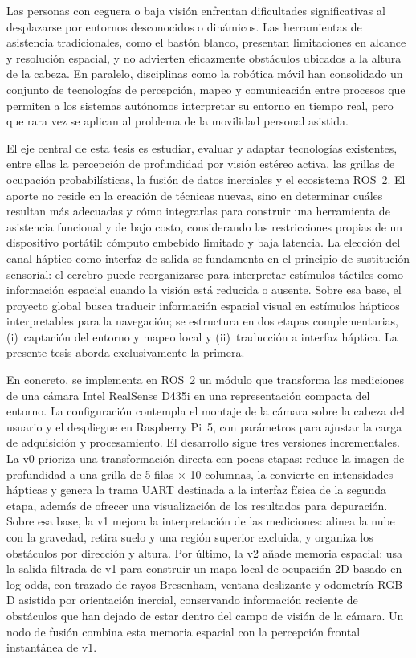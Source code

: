 Las personas con ceguera o baja visión enfrentan dificultades significativas al desplazarse por
entornos desconocidos o dinámicos. Las herramientas de asistencia tradicionales, como el bastón
blanco, presentan limitaciones en alcance y resolución espacial, y no advierten eficazmente
obstáculos ubicados a la altura de la cabeza. En paralelo, disciplinas como la robótica móvil han
consolidado un conjunto de tecnologías de percepción, mapeo y comunicación entre procesos que
permiten a los sistemas autónomos interpretar su entorno en tiempo real, pero que rara vez se
aplican al problema de la movilidad personal asistida.

El eje central de esta tesis es estudiar, evaluar y adaptar tecnologías existentes, entre ellas la
percepción de profundidad por visión estéreo activa, las grillas de ocupación probabilísticas, la
fusión de datos inerciales y el ecosistema ROS~2. El aporte no reside en la creación de técnicas
nuevas, sino en determinar cuáles resultan más adecuadas y cómo integrarlas para construir una
herramienta de asistencia funcional y de bajo costo, considerando las restricciones propias de un
dispositivo portátil: cómputo embebido limitado y baja latencia. La elección del canal háptico como
interfaz de salida se fundamenta en el principio de sustitución sensorial: el cerebro puede
reorganizarse para interpretar estímulos táctiles como información espacial cuando la visión está
reducida o ausente. Sobre esa base, el proyecto global busca traducir información espacial visual
en estímulos hápticos interpretables para la navegación; se estructura en dos etapas
complementarias, (i)~captación del entorno y mapeo local y (ii)~traducción a interfaz háptica. La
presente tesis aborda exclusivamente la primera.

En concreto, se implementa en ROS~2 un módulo que transforma las mediciones de una cámara Intel
RealSense D435i en una representación compacta del entorno. La configuración contempla el montaje
de la cámara sobre la cabeza del usuario y el despliegue en Raspberry Pi~5, con parámetros para
ajustar la carga de adquisición y procesamiento. El desarrollo sigue tres versiones incrementales.
La v0 prioriza una transformación directa con pocas etapas: reduce la imagen de profundidad a una
grilla de 5 filas $\times$ 10 columnas, la convierte en intensidades hápticas y genera la trama
UART destinada a la interfaz física de la segunda etapa, además de ofrecer una visualización de los
resultados para depuración. Sobre esa base, la v1 mejora la interpretación de las mediciones:
alinea la nube con la gravedad, retira suelo y una región superior excluida, y organiza los
obstáculos por dirección y altura. Por último, la v2 añade memoria espacial: usa la salida filtrada
de v1 para construir un mapa local de ocupación 2D basado en log-odds, con trazado de rayos
Bresenham, ventana deslizante y odometría RGB-D asistida por orientación inercial, conservando
información reciente de obstáculos que han dejado de estar dentro del campo de visión de la cámara.
Un nodo de fusión combina esta memoria espacial con la percepción frontal instantánea de v1.

